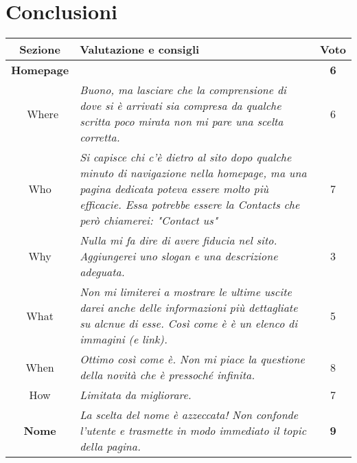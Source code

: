 \section{Conclusioni}
\begin{center}
	\begin{tabularx}{\textwidth}{|c|X|c|}
		\hline
		\textbf{Sezione} & \textbf{Valutazione e consigli} &\textbf{Voto} \\ \hline
		
		\textbf{Homepage} &	&	\textbf{6}\\
		\hdashline 
		\multirow{5}{0cm}\
		Where 	& \textit{Buono, ma lasciare che la comprensione di dove si è arrivati sia compresa da qualche scritta poco mirata non mi pare una scelta corretta.} &	6\\
		Who		& \textit{Si capisce chi c'è dietro al sito dopo qualche minuto di navigazione nella homepage, ma una pagina dedicata poteva essere molto più efficacie. Essa potrebbe essere la Contacts che però chiamerei: "Contact us"} &	7\\
		Why 	& \textit{Nulla mi fa dire di avere fiducia nel sito. Aggiungerei uno slogan e una descrizione adeguata.} &	3\\
		What 	& \textit{Non mi limiterei a mostrare le ultime uscite darei anche delle informazioni più dettagliate su alcnue di esse. Così come è è un elenco di immagini (e link).} &	5\\
		When 	& \textit{Ottimo così come è. Non mi piace la questione della novità che è pressoché infinita.} &	8\\
		How 	& \textit{Limitata da migliorare.} &	7\\
		\hline
		
		\textbf{Nome} & \textit{La scelta del nome è azzeccata! Non confonde l'utente e trasmette in modo immediato il topic della pagina.} & \textbf{9} \\ \hline
		

\end{tabularx}
\end{center}
